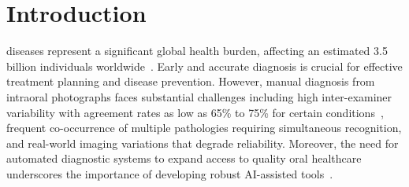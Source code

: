 

\section{Introduction}
\label{sec:introduction}

 diseases represent a significant global health burden, affecting an estimated 3.5 billion individuals worldwide~\cite{ali2025interpretable}. 
Early and accurate diagnosis is crucial for effective treatment planning and disease prevention. However, manual diagnosis from intraoral photographs faces substantial challenges including high inter-examiner variability with agreement rates as low as 65\% to 75\% for certain conditions~\cite{peres2019oral}, frequent co-occurrence of multiple pathologies requiring simultaneous recognition, and real-world imaging variations that degrade reliability. Moreover, the need for automated diagnostic systems to expand access to quality oral healthcare underscores the importance of developing robust AI-assisted tools~\cite{speight2017screening}.

